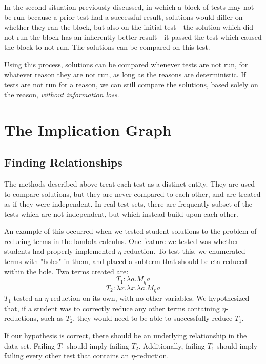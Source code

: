 \documentclass[11pt,twoside]{article}
\theoremstyle{definition}
\begin{document}
In the second situation previously discussed, in wehich a block of tests may not be run because a prior test had a successful result, solutions would differ on whether they ran the block, but also on the initial test---the solution which did not run the block has an inherently better result---it passed the test which caused the block to not run. The solutions can be compared on this test.

Using this process, solutions can be compared whenever tests are not run, for whatever reason they are not run, as long as the reasons are deterministic. If tests are not run for a reason, we can still compare the solutions, based solely on the reason, \emph{without information loss}.

\section{The Implication Graph}
\subsection{Finding Relationships}
The methods described above treat each test as a distinct entity. They are used to compare solutions, but they are never compared to each other, and are treated as if they were independent. In real test sets, there are frequently subset of the tests which are not independent, but which instead build upon each other.

An example of this occurred when we tested student solutions to the problem of reducing terms in the lambda calculus. One feature we tested was whether students had properly implemented $\eta$-reduction. To test this, we enumerated terms with "holes" in them, and placed a subterm that should be eta-reduced within the hole. Two terms created are: 
$$T_1 : \lambda a.M_\eta a$$
$$T_2 : \lambda x.\lambda x.\lambda a.M_\eta a$$
$T_1$ tested an $\eta$-reduction on its own, with no other variables. We hypothesized that, if a student was to correctly reduce any other terms containing $\eta$-reductions, such as $T_2$, they would need to be able to successfully reduce $T_1$.

If our hypothesis is correct, there should be an underlying relationship in the data set. Failing $T_1$ should imply failing $T_2$. Additionally, failing $T_1$ should imply failing every other test that contains an $\eta$-reduction.
\end{document}
